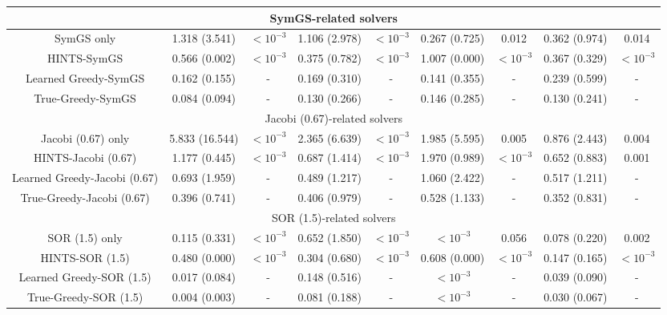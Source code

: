 \documentclass{article}
\begin{document}
\begin{table}[H]
{\begin{tabular}{ccccccccc}
\hline
         \multicolumn{9}{c}{SymGS-related solvers}\\
         \hline
SymGS only & 1.318 (3.541) & $<10^{-3}$ & 1.106 (2.978) & $<10^{-3}$ & 0.267 (0.725) & 0.012 & 0.362 (0.974) & 0.014 \\
HINTS-SymGS & 0.566 (0.002) & $<10^{-3}$ & 0.375 (0.782) & $<10^{-3}$ & 1.007 (0.000) & $<10^{-3}$ & 0.367 (0.329) & $<10^{-3}$ \\
Learned Greedy-SymGS & 0.162 (0.155) & - & 0.169 (0.310) & - & 0.141 (0.355) & - & 0.239 (0.599) & - \\
True-Greedy-SymGS & 0.084 (0.094) & - & 0.130 (0.266) & - & 0.146 (0.285) & - & 0.130 (0.241) & - \\
\hline
         \multicolumn{9}{c}{Jacobi (0.67)-related solvers}\\
         \hline
Jacobi (0.67) only & 5.833 (16.544) & $<10^{-3}$ & 2.365 (6.639) & $<10^{-3}$ & 1.985 (5.595) & 0.005 & 0.876 (2.443) & 0.004 \\
HINTS-Jacobi (0.67) & 1.177 (0.445) & $<10^{-3}$ & 0.687 (1.414) & $<10^{-3}$ & 1.970 (0.989) & $<10^{-3}$ & 0.652 (0.883) & 0.001 \\
Learned Greedy-Jacobi (0.67) & 0.693 (1.959) & - & 0.489 (1.217) & - & 1.060 (2.422) & - & 0.517 (1.211) & - \\
True-Greedy-Jacobi (0.67) & 0.396 (0.741) & - & 0.406 (0.979) & - & 0.528 (1.133) & - & 0.352 (0.831) & - \\
\hline
         \multicolumn{9}{c}{SOR (1.5)-related solvers}\\
         \hline
SOR (1.5) only & 0.115 (0.331) & $<10^{-3}$ & 0.652 (1.850) & $<10^{-3}$ & $<10^{-3}$ & 0.056 & 0.078 (0.220) & 0.002 \\
HINTS-SOR (1.5) & 0.480 (0.000) & $<10^{-3}$ & 0.304 (0.680) & $<10^{-3}$ & 0.608 (0.000) & $<10^{-3}$ & 0.147 (0.165) & $<10^{-3}$ \\
Learned Greedy-SOR (1.5) & 0.017 (0.084) & - & 0.148 (0.516) & - & $<10^{-3}$ & - & 0.039 (0.090) & - \\
True-Greedy-SOR (1.5) & 0.004 (0.003) & - & 0.081 (0.188) & - & $<10^{-3}$ & - & 0.030 (0.067) & - \\
\hline \hline 
\end{tabular}
}
    \label{tab:errorcomparison_fine}
\end{table}
\end{document}
